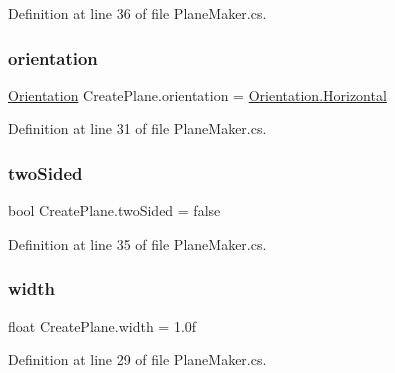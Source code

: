 Definition at line 36 of file Plane\+Maker.\+cs.

\mbox{\label{class_create_plane_af21e407adb4901ade91a4d054cb8524c}} 
\subsubsection{\texorpdfstring{orientation}{orientation}}
{\footnotesize\ttfamily \mbox{\hyperlink{class_create_plane_a7db5f8e98159fe90f49c5ede4e04a3d2}{Orientation}} Create\+Plane.\+orientation = \mbox{\hyperlink{class_create_plane_a7db5f8e98159fe90f49c5ede4e04a3d2ac1b5fa03ecdb95d4a45dd1c40b02527f}{Orientation.\+Horizontal}}}



Definition at line 31 of file Plane\+Maker.\+cs.

\mbox{\label{class_create_plane_ab8f0c3f67b4058cda42d45414b0a61b8}} 
\subsubsection{\texorpdfstring{two\+Sided}{twoSided}}
{\footnotesize\ttfamily bool Create\+Plane.\+two\+Sided = false}



Definition at line 35 of file Plane\+Maker.\+cs.

\mbox{\label{class_create_plane_a8479577416646d58f363f3ce6b1ca8e3}} 
\subsubsection{\texorpdfstring{width}{width}}
{\footnotesize\ttfamily float Create\+Plane.\+width = 1.\+0f}



Definition at line 29 of file Plane\+Maker.\+cs.

\mbox{\label{class_create_plane_a48ce62f06b2b42bbba171e06de8300b4}} 

